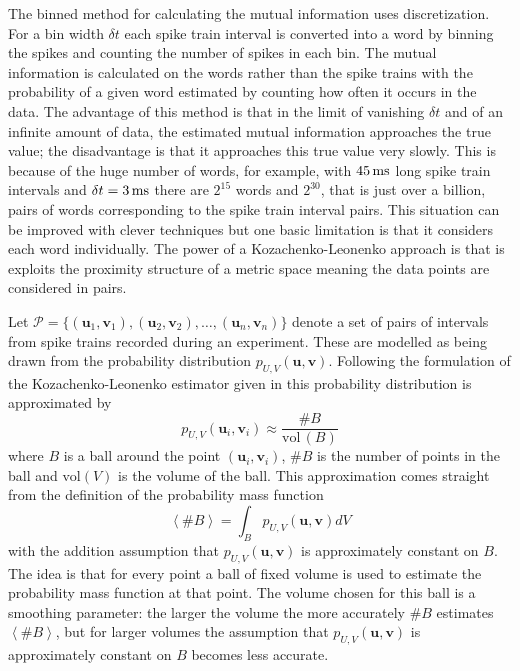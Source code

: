 \documentclass[12pt]{article}
\newcommand{\ms}{\mbox{\,ms}}
\renewcommand{\u}{\mathbf{u}}
\renewcommand{\v}{\mathbf{v}}
\begin{document}
The binned method for calculating the mutual information uses
discretization. For a bin width $\delta t$ each spike train interval
is converted into a word by binning the spikes and counting the number
of spikes in each bin. The mutual information is calculated on the
words rather than the spike trains with the probability of a given
word estimated by counting how often it occurs in the data. The
advantage of this method is that in the limit of vanishing $\delta t$
and of an infinite amount of data, the estimated mutual information
approaches the true value; the disadvantage is that it approaches this
true value very slowly. This is because of the huge number of words,
for example, with $45\ms$ long spike train intervals and $\delta
t=3\ms$ there are $2^{15}$ words and $2^{30}$, that is just over a
billion, pairs of words corresponding to the spike train interval
pairs. This situation can be improved with clever techniques
\citep{TrevesPanzeri1995,NemenmanEtAl2004,MagriEtAl2009} but one basic
limitation is that it considers each word individually. The power of a
Kozachenko-Leonenko approach is that is exploits the proximity
structure of a metric space meaning the data points are considered in
pairs.

Let $ \mathcal{P}=\{(\u_1,\v_1),(\u_2,\v_2),\ldots,(\u_n,\v_n)\} $
denote a set of pairs of intervals from spike trains recorded during an
experiment. These are modelled as being drawn from the probability
distribution $p_{U,V}(\u,\v)$. Following the formulation of the
Kozachenko-Leonenko estimator given in \citet{Houghton2015} this
probability distribution is approximated by
\begin{equation}
 p_{U,V}(\u_i,\v_i)\approx\frac{\#B}{\mbox{vol}\,(B)}
\end{equation}
where $B$ is a ball around the point $(\u_i,\v_i)$, $\#B$ is the number of
points in the ball and $\mbox{vol}(V)$ is the volume of the ball. This
approximation comes straight from the definition of the probability mass function
\begin{equation}
\left\langle \#B\right\rangle = \int_B p_{U,V}(\u,\v)dV
\end{equation}
with the addition assumption that $p_{U,V}(\u,\v)$ is approximately
constant on $B$. The idea is that for every point a ball of fixed
volume is used to estimate the probability mass function at that
point. The volume chosen for this ball is a smoothing parameter: the
larger the volume the more accurately $\#B$ estimates $\left\langle
\#B\right\rangle$, but for larger volumes the assumption that
$p_{U,V}(\u,\v)$ is approximately constant on $B$ becomes less
accurate.
\end{document}
